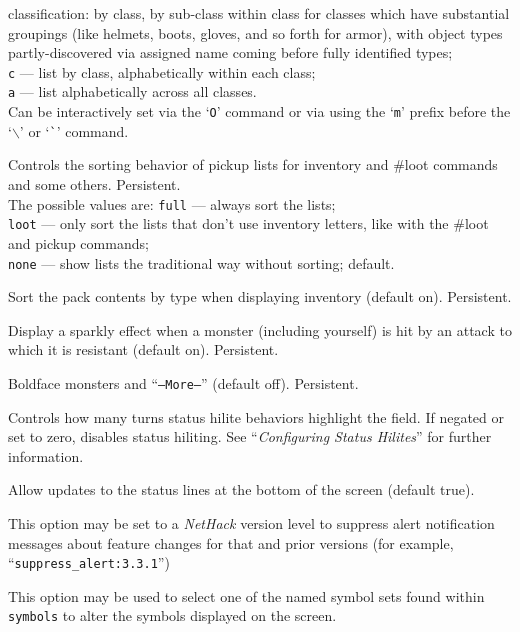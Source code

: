 classification: by class, by sub-class within class for classes which
have substantial groupings (like helmets, boots, gloves, and so forth
for armor), with object types partly-discovered via assigned name coming
before fully identified types;
\\
{\tt c} --- list by class, alphabetically within each class;\\
{\tt a} --- list alphabetically across all classes.\\
Can be interactively set via the `{\tt O}' command or via using
the `{\tt m}' prefix before the `{\tt $\backslash$}'
or `{\tt \`{}}' command.
\item[\ib{sortloot}]
Controls the sorting behavior of pickup lists for inventory
and \#loot commands and some others.  Persistent.
\\
The possible values are:
{\tt full} --- always sort the lists;\\
{\tt loot} --- only sort the lists that don't use inventory
       letters, like with the \#loot and pickup commands;\\
{\tt none} --- show lists the traditional way without sorting; default.
\item[\ib{sortpack}]
Sort the pack contents by type when displaying inventory (default on).
Persistent.
\item[\ib{sparkle}]
Display a sparkly effect when a monster (including yourself) is hit by an
attack to which it is resistant (default on).  Persistent.
\item[\ib{standout}]
Boldface monsters and ``{\tt --More--}'' (default off).  Persistent.
\item[\ib{statushilites}]
Controls how many turns status hilite behaviors highlight
the field. If negated or set to zero, disables status hiliting.
See ``{\it Configuring Status Hilites\/}'' for further information.
\item[\ib{status\verb+_+updates}]
Allow updates to the status lines at the bottom of the screen (default true).
\item[\ib{suppress\verb+_+alert}]
This option may be set to a {\it NetHack\/} version level to suppress
alert notification messages about feature changes for that
and prior versions (for example, ``{\tt suppress\verb+_+alert:3.3.1}'')
\item[\ib{symset}]
This option may be used to select one of the named symbol sets found within
{\tt symbols} to alter the symbols displayed on the screen.

